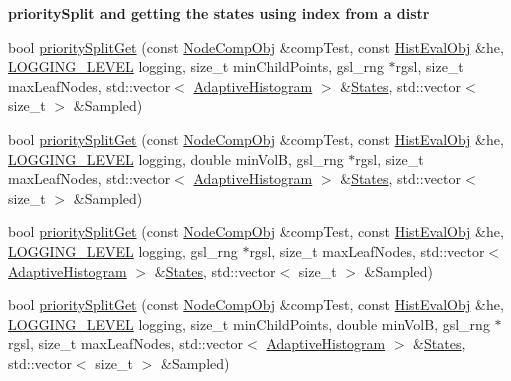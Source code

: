 \begin{Indent}{\bf priority\-Split and getting the states using index from a distr}
\begin{DoxyCompactItemize}
\item 
bool \hyperlink{classsubpavings_1_1AdaptiveHistogram_af4e1c9c71ca8835f8ee3a78204f63d49}{priority\-Split\-Get} (const \hyperlink{classsubpavings_1_1NodeCompObj}{\-Node\-Comp\-Obj} \&comp\-Test, const \hyperlink{classsubpavings_1_1HistEvalObj}{\-Hist\-Eval\-Obj} \&he, \hyperlink{namespacesubpavings_aef8e51096b59ecaf1a1e9b2ee24b6089}{\-L\-O\-G\-G\-I\-N\-G\-\_\-\-L\-E\-V\-E\-L} logging, size\-\_\-t min\-Child\-Points, gsl\-\_\-rng $\ast$rgsl, size\-\_\-t max\-Leaf\-Nodes, std\-::vector$<$ \hyperlink{classsubpavings_1_1AdaptiveHistogram}{\-Adaptive\-Histogram} $>$ \&\hyperlink{CatalanCoeff_8hpp_ac525a0f6dc3802f95ee1ea51f9be6826}{\-States}, std\-::vector$<$ size\-\_\-t $>$ \&\-Sampled)
\item 
bool \hyperlink{classsubpavings_1_1AdaptiveHistogram_a761f68d3b8f183d4fda926732fda70f9}{priority\-Split\-Get} (const \hyperlink{classsubpavings_1_1NodeCompObj}{\-Node\-Comp\-Obj} \&comp\-Test, const \hyperlink{classsubpavings_1_1HistEvalObj}{\-Hist\-Eval\-Obj} \&he, \hyperlink{namespacesubpavings_aef8e51096b59ecaf1a1e9b2ee24b6089}{\-L\-O\-G\-G\-I\-N\-G\-\_\-\-L\-E\-V\-E\-L} logging, double min\-Vol\-B, gsl\-\_\-rng $\ast$rgsl, size\-\_\-t max\-Leaf\-Nodes, std\-::vector$<$ \hyperlink{classsubpavings_1_1AdaptiveHistogram}{\-Adaptive\-Histogram} $>$ \&\hyperlink{CatalanCoeff_8hpp_ac525a0f6dc3802f95ee1ea51f9be6826}{\-States}, std\-::vector$<$ size\-\_\-t $>$ \&\-Sampled)
\item 
bool \hyperlink{classsubpavings_1_1AdaptiveHistogram_a8654a1a779b1c0e6d0dcec82f436efd6}{priority\-Split\-Get} (const \hyperlink{classsubpavings_1_1NodeCompObj}{\-Node\-Comp\-Obj} \&comp\-Test, const \hyperlink{classsubpavings_1_1HistEvalObj}{\-Hist\-Eval\-Obj} \&he, \hyperlink{namespacesubpavings_aef8e51096b59ecaf1a1e9b2ee24b6089}{\-L\-O\-G\-G\-I\-N\-G\-\_\-\-L\-E\-V\-E\-L} logging, gsl\-\_\-rng $\ast$rgsl, size\-\_\-t max\-Leaf\-Nodes, std\-::vector$<$ \hyperlink{classsubpavings_1_1AdaptiveHistogram}{\-Adaptive\-Histogram} $>$ \&\hyperlink{CatalanCoeff_8hpp_ac525a0f6dc3802f95ee1ea51f9be6826}{\-States}, std\-::vector$<$ size\-\_\-t $>$ \&\-Sampled)
\item 
bool \hyperlink{classsubpavings_1_1AdaptiveHistogram_a36a5db0649767e9045cf985f52f985ca}{priority\-Split\-Get} (const \hyperlink{classsubpavings_1_1NodeCompObj}{\-Node\-Comp\-Obj} \&comp\-Test, const \hyperlink{classsubpavings_1_1HistEvalObj}{\-Hist\-Eval\-Obj} \&he, \hyperlink{namespacesubpavings_aef8e51096b59ecaf1a1e9b2ee24b6089}{\-L\-O\-G\-G\-I\-N\-G\-\_\-\-L\-E\-V\-E\-L} logging, size\-\_\-t min\-Child\-Points, double min\-Vol\-B, gsl\-\_\-rng $\ast$rgsl, size\-\_\-t max\-Leaf\-Nodes, std\-::vector$<$ \hyperlink{classsubpavings_1_1AdaptiveHistogram}{\-Adaptive\-Histogram} $>$ \&\hyperlink{CatalanCoeff_8hpp_ac525a0f6dc3802f95ee1ea51f9be6826}{\-States}, std\-::vector$<$ size\-\_\-t $>$ \&\-Sampled)
\end{DoxyCompactItemize}
\end{Indent}
